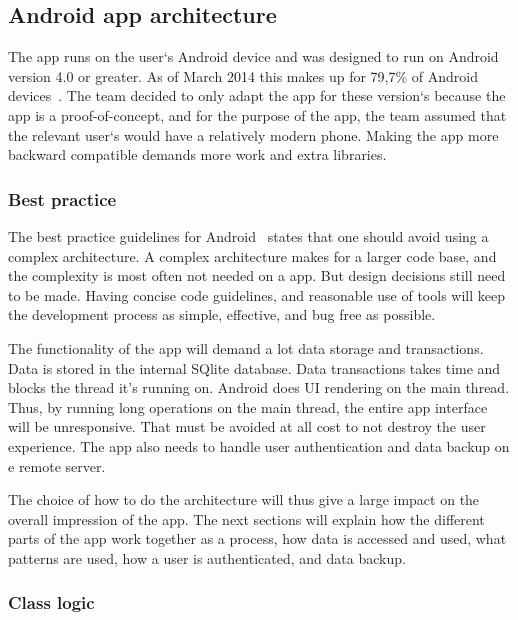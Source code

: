 \subsection{Android app architecture}
The app runs on the user`s Android device and was designed to run on Android version 4.0 or greater. As of March 2014 this makes up for 79,7\% of Android devices~\cite{AndroidDeviceFragmentation}.
The team decided to only adapt the app for these version`s because the app is a proof-of-concept, and for the purpose of the app, the team assumed that the relevant user`s would have a relatively modern phone. Making the app more backward compatible demands more work and extra libraries. 

\subsubsection{Best practice}

The best practice guidelines for Android~\cite{androidPracticePerformance} states that one should avoid using a complex architecture. A complex architecture makes for a larger code base, and the complexity is most often not needed on a app. But design decisions still need to be made. Having concise code guidelines, and reasonable use of tools will keep the development process as simple, effective, and bug free as possible. 

The functionality of the app will demand a lot data storage and transactions. Data is stored in the internal SQlite database. Data transactions takes time and blocks the thread it's running on.
Android does UI rendering on the main thread. Thus, by running long operations on the main thread, the entire app interface will be unresponsive. That must be avoided at all cost to not destroy the user experience. The app also needs to handle user authentication and data backup on e remote server.

The choice of how to do the architecture will thus give a large impact on the overall impression of the app. The next sections will explain how the different parts of the app work together as a process, how data is accessed and used, what patterns are used, how a user is authenticated, and data backup.


\subsubsection{Class logic}

